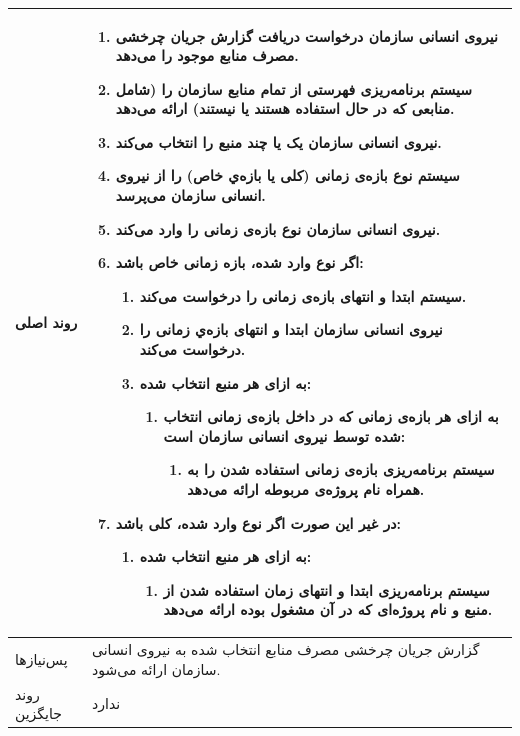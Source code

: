 \begin{table}[H]
\begin{tabular}{|p{3cm}|p{10cm}|}
		
		روند اصلی &
		\begin{enumerate}[topsep=0cm,leftmargin=0.5cm]
			\item نیروی انسانی سازمان درخواست دریافت گزارش جریان چرخشی مصرف منابع موجود را می‌دهد.
			\item سیستم برنامه‌ریزی فهرستی از تمام منابع سازمان را (شامل منابعی که در حال استفاده هستند یا نیستند) ارائه می‌دهد.
			\item نیروی انسانی سازمان یک یا چند منبع را انتخاب می‌کند.
			\item سیستم نوع بازه‌ی زمانی (کلی یا بازه‌ي خاص) را از نیروی انسانی سازمان می‌پرسد.
			\item نیروی انسانی سازمان نوع بازه‌ی زمانی را وارد می‌کند.
			\item اگر نوع وارد شده، بازه زمانی خاص باشد:
			\begin{enumerate}
				\item سیستم ابتدا و انتهای بازه‌ی زمانی را درخواست می‌کند.
				\item نیروی انسانی سازمان ابتدا و انتهای بازه‌ي زمانی را درخواست می‌کند.
				\item به ازای هر منبع انتخاب شده:
					\begin{enumerate}[topsep=0cm,leftmargin=0.5cm]
						\item به ازای هر بازه‌ی زمانی که در داخل بازه‌ی زمانی انتخاب شده توسط نیروی انسانی سازمان است:
						\begin{enumerate}
								\item سیستم برنامه‌ریزی بازه‌ی زمانی استفاده شدن را به همراه نام پروژه‌ی مربوطه ارائه می‌دهد.
						\end{enumerate}
					\end{enumerate}		
			\end{enumerate}
			\item در غیر این صورت اگر نوع وارد شده، کلی باشد:
			\begin{enumerate}
				\item به ازای هر منبع انتخاب شده:
				\begin{enumerate}[topsep=0cm,leftmargin=0.5cm]
					\item سیستم برنامه‌ریزی ابتدا و انتهای زمان استفاده شدن از منبع و نام پروژه‌ای که در آن مشغول بوده ارائه می‌دهد.
				\end{enumerate}		
			\end{enumerate}			
		\end{enumerate} \\
		\hline
		
		پس‌نیازها &
		گزارش جریان چرخشی مصرف منابع انتخاب شده به نیروی انسانی سازمان ارائه می‌شود. \\
		\hline
		
		روند جایگزین
		& ندارد \\
		\hline
		
	\end{tabular}
\end{table}

